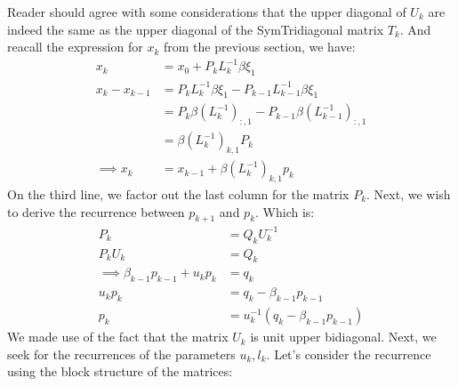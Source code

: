 \documentclass[]{article}
\theoremstyle{definition}
\begin{document}
            Reader should agree with some considerations that the upper diagonal of $U_k$ are indeed the same as the upper diagonal of the SymTridiagonal matrix $T_k$. And reacall the expression for $x_k$ from the previous section, we have: 
            \begin{align}
                x_k &= x_0 + P_k L_k^{-1}\beta \xi_1 \\ 
                x_{k} - x_{k - 1} &= 
                P_k L_k^{-1} \beta \xi_1 - P_{k - 1}L^{-1}_{k - 1}\beta \xi_1
                \\
                &= P_k \beta(L^{-1}_k)_{:, 1} - P_{k - 1}\beta(L^{-1}_{k - 1})_{:, 1}
                \\
                &= \beta(L^{-1}_k)_{k, 1}P_k
                \\
                \implies x_k &= x_{k - 1} + \beta(L^{-1}_k)_{k, 1}p_k
            \end{align}
            On the third line, we factor out the last column for the matrix $P_k$. Next, we wish to derive the recurrence between $p_{k + 1}$ and $p_k$. Which is: 
            \begin{align}
                P_k &= Q_k U^{-1}_k
                \\
                P_kU_k &= Q_k
                \\\implies
                \beta_{k - 1}p_{k - 1} + u_k p_k &= q_k 
                \\
                u_k p_k &= q_k - \beta_{k - 1}p_{k - 1}
                \\
                p_k &= u^{-1}_k(q_k - \beta_{k - 1}p_{k - 1})
            \end{align}
            We made use of the fact that the matrix $U_k$ is unit upper bidiagonal. Next, we seek for the recurrences of the parameters $u_k, l_k$. Let's consider the recurrence using the block structure of the matrices: 
\end{document}
